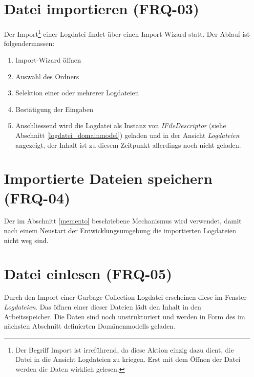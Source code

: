 \section{Datei importieren (FRQ-03)}
Der Import\footnote{Der Begriff Import ist irreführend, da diese Aktion einzig dazu dient, die Datei in die Ansicht Logdateien zu kriegen. Erst mit dem Öffnen der Datei werden die Daten wirklich gelesen.} einer Logdatei findet über einen Import-Wizard statt. Der Ablauf ist folgendermassen:
\begin{enumerate}
	\item Import-Wizard öffnen
	\item Auswahl des Ordners
	\item Selektion einer oder mehrerer Logdateien
	\item Bestätigung der Eingaben
	\item Anschliessend wird die Logdatei als Instanz von \textit{IFileDescriptor} (siehe Abschnitt \ref{logdatei_domainmodel}) geladen und in der Ansicht \textit{Logdateien} angezeigt, der Inhalt ist zu diesem Zeitpunkt allerdings noch nicht geladen.
\end{enumerate}

\section{Importierte Dateien speichern (FRQ-04)}
Der im Abschnitt \ref{memento} beschriebene Mechanismus wird verwendet, damit nach einem Neustart der Entwicklungsumgebung die importierten Logdateien nicht weg sind. 

\section{Datei einlesen (FRQ-05)}
Durch den Import einer Garbage Collection Logdatei erscheinen diese im Fenster \textit{Logdateien}. Das öffnen einer dieser Dateien lädt den Inhalt in den Arbeitsspeicher. Die Daten sind noch unstrukturiert und werden in Form des im nächsten Abschnitt definierten Domänenmodells geladen.

